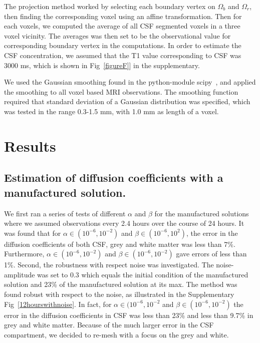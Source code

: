 \documentclass[12pt,a4paper]{article}
\newcommand{\kam}[1]{\textcolor{blue}{#1}}
\begin{document}
The projection method worked by selecting each boundary vertex on $\Omega_b$ and $\Omega_r$, then finding the corresponding voxel using an affine transformation. Then for each voxels, we  computed the average of all CSF segmented voxels in a three voxel vicinity. The averages was then set to be the observational value for corresponding boundary vertex in the computations. In order to estimate the CSF concentration, we assumed that the T1 value corresponding to CSF was 3000 ms, which is shown in Fig~\ref{figureF}] in the supplementary. 

We used the Gaussian smoothing found in the python-module scipy~\cite{jones2001scipy}, and applied the smoothing to all voxel based MRI observations. The smoothing function required that standard deviation of a Gaussian distribution was specified, which was tested in the range 0.3-1.5 mm, with 1.0 mm as length of a voxel. 






\section{Results}

\subsection{Estimation of diffusion coefficients with a manufactured solution.} 
We first ran a series of tests of different $\alpha$ and $\beta$ for the manufactured solutions where we assumed observations every 2.4 hours 
over the course of 24 hours. It was found that for $\alpha \in (10^{-6}, 10^{-2})$ and $\beta\in(10^{-6}, 10^2)$, the error in 
the diffusion coefficients of both CSF, grey and white matter was less than 7\%. Furthermore,  
$\alpha \in (10^{-6}, 10^{-2})$ and $\beta\in(10^{-6}, 10^{-2})$ gave errors of less than 1\%. Second, the robustness with respect noise
was investigated. The noise-amplitude was set to 0.3 which equals the initial condition of the manufactured solution
and 23\% of the manufactured solution at its max. The method was found robust with respect to the noise, as illustrated in the Supplementary Fig~\ref{12hourswithnoise}.  In fact, for  $\alpha \in (10^{-6}, 10^{-2}$ and $\beta\in(10^{-6}, 10^{-2})$ the error in the diffusion coefficients in CSF was less than 23\% and less than 9.7\% in grey and white matter. Because of the much larger 
error in the CSF compartment, we decided to re-mesh with a focus on the grey and white.
 
\end{document}
